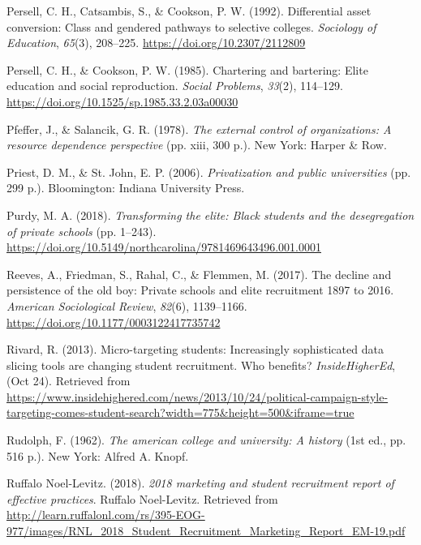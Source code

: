 \documentclass[
  12pt,
]{article}
\newlength{\cslhangindent}
\newlength{\cslentryspacingunit} %
\newenvironment{CSLReferences}[2] %
 {%
  \setlength{\parindent}{0pt}
  \ifodd #1
  \let\oldpar\par
  \def\par{\hangindent=\cslhangindent\oldpar}
  \fi
  \setlength{\parskip}{#2\cslentryspacingunit}
 }%
 {}
\begin{document}
\begin{CSLReferences}{1}{0}
\leavevmode{}%
Persell, C. H., Catsambis, S., \& Cookson, P. W. (1992). Differential asset conversion: Class and gendered pathways to selective colleges. \emph{Sociology of Education}, \emph{65}(3), 208--225. \url{https://doi.org/10.2307/2112809}

\leavevmode{}%
Persell, C. H., \& Cookson, P. W. (1985). Chartering and bartering: Elite education and social reproduction. \emph{Social Problems}, \emph{33}(2), 114--129. \url{https://doi.org/10.1525/sp.1985.33.2.03a00030}

\leavevmode{}%
Pfeffer, J., \& Salancik, G. R. (1978). \emph{The external control of organizations: A resource dependence perspective} (pp. xiii, 300 p.). New York: Harper \& Row.

\leavevmode{}%
Priest, D. M., \& St. John, E. P. (2006). \emph{Privatization and public universities} (pp. 299 p.). Bloomington: Indiana University Press.

\leavevmode{}%
Purdy, M. A. (2018). \emph{Transforming the elite: Black students and the desegregation of private schools} (pp. 1--243). \url{https://doi.org/10.5149/northcarolina/9781469643496.001.0001}

\leavevmode{}%
Reeves, A., Friedman, S., Rahal, C., \& Flemmen, M. (2017). The decline and persistence of the old boy: Private schools and elite recruitment 1897 to 2016. \emph{American Sociological Review}, \emph{82}(6), 1139--1166. \url{https://doi.org/10.1177/0003122417735742}

\leavevmode{}%
Rivard, R. (2013). Micro-targeting students: Increasingly sophisticated data slicing tools are changing student recruitment. Who benefits? \emph{InsideHigherEd}, (Oct 24). Retrieved from \url{https://www.insidehighered.com/news/2013/10/24/political-campaign-style-targeting-comes-student-search?width=775\&height=500\&iframe=true}

\leavevmode{}%
Rudolph, F. (1962). \emph{The american college and university: A history} (1st ed., pp. 516 p.). New York: Alfred A. Knopf.

\leavevmode{}%
Ruffalo Noel-Levitz. (2018). \emph{2018 marketing and student recruitment report of effective practices}. Ruffalo Noel-Levitz. Retrieved from \url{http://learn.ruffalonl.com/rs/395-EOG-977/images/RNL_2018_Student_Recruitment_Marketing_Report_EM-19.pdf}


\end{CSLReferences}
\end{document}
